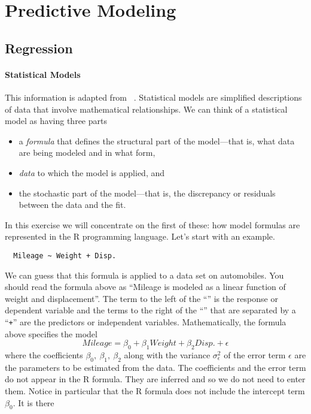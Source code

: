 \chapter{Predictive Modeling}

\section{Regression}

\subsubsection*{Statistical Models}

This information is adapted from ~\cite{chambers:1992}.
Statistical models are simplified descriptions of data that involve
mathematical relationships. We can think of a statistical model as
having three parts
\begin{itemize}
\item a \emph{formula} that defines the structural part of the model---that is,
  what data are being modeled and in what form,
\item \emph{data} to which the model is applied, and
\item the stochastic part of the model---that is, 
  the discrepancy or residuals between the data and the fit.
\end{itemize}
In this exercise we will concentrate on the first of these: how model
formulas are represented in the R programming language. Let's start
with an example.
\begin{Verbatim}
  Mileage ~ Weight + Disp.
\end{Verbatim}
We can guess that this
formula is applied to a data set on automobiles. You should read the
formula above as ``Mileage is modeled as a linear function of weight
and displacement''. The term to the left of the ``\mtilde'' is the
response or dependent variable and the terms to the right of the ``\mtilde''
that are separated by a ``\texttt{+}'' are the predictors or independent variables.
Mathematically, the formula
above specifies the model
\[
  Mileage = \beta_0 + \beta_1 Weight + \beta_2 Disp. + \epsilon
\]
where the coefficients $\beta_0,~\beta_1,~\beta_2$  along with the variance $\sigma_{\epsilon}^2$ of
the error term $\epsilon$ are the parameters to be estimated from the data.
The coefficients and the error term do not appear in the R formula.
They are inferred and so we do not need to enter them. Notice in particular
that the R formula does not include the intercept term $\beta_0$. It is there
